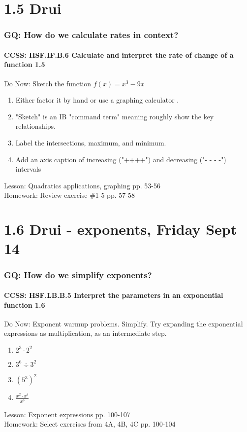 \documentclass{beamer}
\begin{document}
\section{1.5 Drui}
  \frame
  {
    \frametitle{GQ: How do we calculate rates in context?}
    \framesubtitle{CCSS: HSF.IF.B.6 Calculate and interpret the rate of change of a function   \alert{1.5}}

    \begin{block}{Do Now: Sketch the function $f(x)=x^3-9x$}
      \begin{enumerate}
      \item Either factor it by hand or use a graphing calculator .
      \item "Sketch" is an IB "command term" meaning roughly show the key relationships.
      \item Label the intersections, maximum, and minimum.
      \item Add an axis caption of increasing ("++++") and decreasing ("- - - -") intervals
      \end{enumerate}
   \end{block}
    Lesson: Quadratics applications, graphing pp. 53-56\\ \bigskip
    Homework: Review exercise \#1-5 pp. 57-58
  }

\section{1.6 Drui - exponents, Friday Sept 14}
  \frame
  {
    \frametitle{GQ: How do we simplify exponents?}
    \framesubtitle{CCSS: HSF.LB.B.5 Interpret the parameters in an exponential function  \alert{1.6}}

    \begin{block}{Do Now: Exponent warmup problems. Simplify. Try expanding the exponential expressions as multiplication, as an intermediate step.}
      \begin{enumerate}
      \item $2^3 \cdot 2^2$
      \item $3^6 \div 3^2$
      \item $(5^3)^2$
      \item $\displaystyle \frac{x^2 \cdot x^4}{x^3}$
      \end{enumerate}
   \end{block}
    Lesson: Exponent expressions pp. 100-107\\ \bigskip
    Homework: Select exercises from  4A, 4B, 4C pp. 100-104
  }

  
\end{document}
